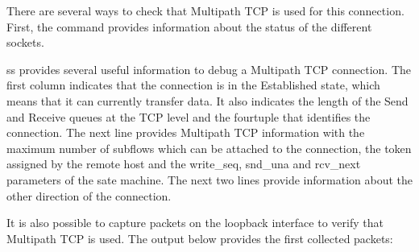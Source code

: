 \documentclass[letterpaper,10pt,english]{sphinxmanual}
\begin{document}
\sphinxAtStartPar
There are several ways to check that Multipath TCP is used for this connection. First, the  command provides information about the status of the different sockets.

\begin{sphinxVerbatim}[commandchars=\\\{\}]
\end{sphinxVerbatim}

\sphinxAtStartPar
ss provides several useful information to debug a Multipath TCP connection. The first column indicates that the connection is in the Established state, which means that it can currently transfer data. It also indicates the length of the Send and Receive queues at the TCP level and the four\sphinxhyphen{}tuple that identifies the connection. The next line provides Multipath TCP information with the maximum number of subflows which can be attached to the connection, the token assigned by the remote host and the write\_seq, snd\_una and rcv\_next parameters of the sate machine. The next two lines provide information about the other direction of the connection.

\sphinxAtStartPar
It is also possible to capture packets on the loopback interface to verify that Multipath TCP is used. The output below provides the first collected packets:
\end{document}
